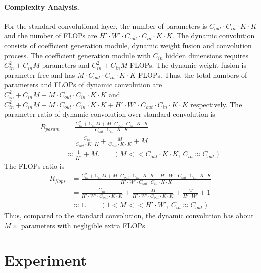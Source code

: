 \documentclass{article}
\begin{document}
\paragraph{Complexity Analysis.}
For the standard convolutional layer, the number of parameters is $C_{out}\cdot C_{in}\cdot K\cdot K$ and the number of FLOPs are $H'\cdot W'\cdot C_{out}\cdot C_{in}\cdot K\cdot K$. The dynamic convolution consists of coefficient generation module, dynamic weight fusion and convolution process.
The coefficient generation module with $C_{in}$ hidden dimensions requires $C_{in}^2+C_{in}M$ parameters and $C_{in}^2+C_{in}M$ FLOPs. 
The dynamic weight fusion is parameter-free and has $M\cdot C_{out}\cdot C_{in}\cdot K\cdot K$ FLOPs. 
Thus, the total numbers of parameters and FLOPs of dynamic convolution are $C_{in}^2+C_{in}M + M\cdot C_{out}\cdot C_{in}\cdot K\cdot K$ and $C_{in}^2+C_{in}M + M\cdot C_{out}\cdot C_{in}\cdot K\cdot K+H'\cdot W'\cdot C_{out}\cdot C_{in}\cdot K\cdot K$ respectively. The parameter ratio of dynamic convolution over standard convolution is
\begin{equation}
	\begin{aligned}		
		R_{param} &= \frac{C_{in}^2+C_{in}M + M\cdot C_{out}\cdot C_{in}\cdot K\cdot K}{C_{out}\cdot C_{in}\cdot K\cdot K} \\
		&= \frac{C_{in}}{C_{out}\cdot K\cdot K} + \frac{M}{C_{out}\cdot K\cdot K} + M\\
		&\approx \frac{1}{K^2} + M. \qquad (M<<C_{out}\cdot K\cdot K,~C_{in}\approx C_{out})
	\end{aligned}
\end{equation}
The FLOPs ratio is
\begin{equation}
	\begin{aligned}
		R_{flops} &= \frac{C_{in}^2+C_{in}M + M\cdot C_{out}\cdot C_{in}\cdot K\cdot K+H'\cdot W'\cdot C_{out}\cdot C_{in}\cdot K\cdot K}{H'\cdot W'\cdot C_{out}\cdot C_{in}\cdot K\cdot K} \\
		&= \frac{C_{in}}{H'\cdot W'\cdot C_{out}\cdot K\cdot K} + \frac{M}{H'\cdot W'\cdot C_{out}\cdot K\cdot K} + \frac{M}{H'\cdot W'} + 1\\
		&\approx 1.  \qquad (1<M<<H'\cdot W',~C_{in}\approx C_{out})
	\end{aligned}
\end{equation}
Thus, compared to the standard convolution, the dynamic convolution has about $M\times$ parameters with negligible extra FLOPs. 

\section{Experiment}
\end{document}
